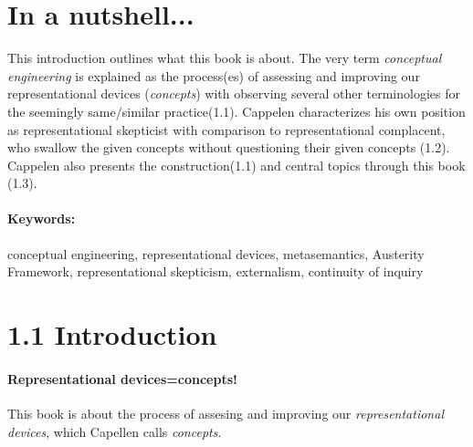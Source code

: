 \documentclass[
10pt, %
a4paper, %
twocolumn, %
landscape %
]{article}
\begin{document}
\pagestyle{myheadings} %
\markright{\doctitle} %


\thispagestyle{plain} %

\printtitle %


\section*{In a nutshell... }
This introduction outlines what this book is about.
The very term \emph{conceptual engineering} is explained as the process(es) of assessing and improving our representational devices (\emph{concepts}) with observing several other terminologies for the seemingly same/similar practice(1.1).
Cappelen characterizes his own position as representational skepticist with comparison to representational complacent, who swallow the given concepts without questioning their given concepts (1.2).
Cappelen also presents the construction(1.1)  and central topics through this book (1.3).

\paragraph{Keywords:}
conceptual engineering,
representational devices,
metasemantics,
Austerity Framework,
representational skepticism,
externalism,
continuity of inquiry

\section*{1.1 Introduction}
\paragraph{Representational devices=concepts!}
This book is about the process of assesing and improving our \emph{representational devices}, which Capellen calls \emph{concepts}.
\end{document}
